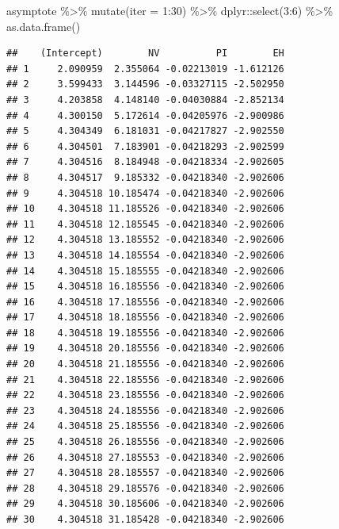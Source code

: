 \documentclass[
  ignorenonframetext,
]{beamer}
\newenvironment{Shaded}{\begin{snugshade}}{\end{snugshade}}
\newcommand{\AttributeTok}[1]{\textcolor[rgb]{0.77,0.63,0.00}{#1}}
\newcommand{\DecValTok}[1]{\textcolor[rgb]{0.00,0.00,0.81}{#1}}
\newcommand{\FunctionTok}[1]{\textcolor[rgb]{0.00,0.00,0.00}{#1}}
\newcommand{\NormalTok}[1]{#1}
\newcommand{\SpecialCharTok}[1]{\textcolor[rgb]{0.00,0.00,0.00}{#1}}
\begin{document}
\begin{frame}[fragile]{}
\protect\hypertarget{section-23}{}
\tiny

\begin{Shaded}
\begin{Highlighting}[]
\NormalTok{asymptote }\SpecialCharTok{\%\textgreater{}\%} \FunctionTok{mutate}\NormalTok{(}\AttributeTok{iter =} \DecValTok{1}\SpecialCharTok{:}\DecValTok{30}\NormalTok{) }\SpecialCharTok{\%\textgreater{}\%} 
\NormalTok{  dplyr}\SpecialCharTok{::}\FunctionTok{select}\NormalTok{(}\DecValTok{3}\SpecialCharTok{:}\DecValTok{6}\NormalTok{) }\SpecialCharTok{\%\textgreater{}\%} \FunctionTok{as.data.frame}\NormalTok{()}
\end{Highlighting}
\end{Shaded}

\begin{verbatim}
##    (Intercept)        NV          PI        EH
## 1     2.090959  2.355064 -0.02213019 -1.612126
## 2     3.599433  3.144596 -0.03327115 -2.502950
## 3     4.203858  4.148140 -0.04030884 -2.852134
## 4     4.300150  5.172614 -0.04205976 -2.900986
## 5     4.304349  6.181031 -0.04217827 -2.902550
## 6     4.304501  7.183901 -0.04218293 -2.902599
## 7     4.304516  8.184948 -0.04218334 -2.902605
## 8     4.304517  9.185332 -0.04218340 -2.902606
## 9     4.304518 10.185474 -0.04218340 -2.902606
## 10    4.304518 11.185526 -0.04218340 -2.902606
## 11    4.304518 12.185545 -0.04218340 -2.902606
## 12    4.304518 13.185552 -0.04218340 -2.902606
## 13    4.304518 14.185554 -0.04218340 -2.902606
## 14    4.304518 15.185555 -0.04218340 -2.902606
## 15    4.304518 16.185556 -0.04218340 -2.902606
## 16    4.304518 17.185556 -0.04218340 -2.902606
## 17    4.304518 18.185556 -0.04218340 -2.902606
## 18    4.304518 19.185556 -0.04218340 -2.902606
## 19    4.304518 20.185556 -0.04218340 -2.902606
## 20    4.304518 21.185556 -0.04218340 -2.902606
## 21    4.304518 22.185556 -0.04218340 -2.902606
## 22    4.304518 23.185556 -0.04218340 -2.902606
## 23    4.304518 24.185556 -0.04218340 -2.902606
## 24    4.304518 25.185556 -0.04218340 -2.902606
## 25    4.304518 26.185556 -0.04218340 -2.902606
## 26    4.304518 27.185553 -0.04218340 -2.902606
## 27    4.304518 28.185557 -0.04218340 -2.902606
## 28    4.304518 29.185576 -0.04218340 -2.902606
## 29    4.304518 30.185606 -0.04218340 -2.902606
## 30    4.304518 31.185428 -0.04218340 -2.902606
\end{verbatim}
\end{frame}
\end{document}
